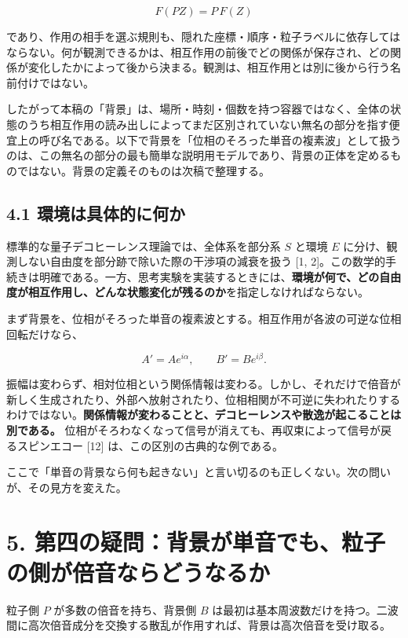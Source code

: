 \documentclass[
  a4paper,
]{ltjsarticle}
\begin{document}
\[
F(PZ)=P\,F(Z)
\]

であり、作用の相手を選ぶ規則も、隠れた座標・順序・粒子ラベルに依存してはならない。何が観測できるかは、相互作用の前後でどの関係が保存され、どの関係が変化したかによって後から決まる。観測は、相互作用とは別に後から行う名前付けではない。

したがって本稿の「背景」は、場所・時刻・個数を持つ容器ではなく、全体の状態のうち相互作用の読み出しによってまだ区別されていない無名の部分を指す便宜上の呼び名である。以下で背景を「位相のそろった単音の複素波」として扱うのは、この無名の部分の最も簡単な説明用モデルであり、背景の正体を定めるものではない。背景の定義そのものは次稿で整理する。

\subsection{4.1
環境は具体的に何か}\label{ux74b0ux5883ux306fux5177ux4f53ux7684ux306bux4f55ux304b}

標準的な量子デコヒーレンス理論では、全体系を部分系 \(S\) と環境 \(E\)
に分け、観測しない自由度を部分跡で除いた際の干渉項の減衰を扱う {[}1,
2{]}。この数学的手続きは明確である。一方、思考実験を実装するときには、\textbf{環境が何で、どの自由度が相互作用し、どんな状態変化が残るのか}を指定しなければならない。

まず背景を、位相がそろった単音の複素波とする。相互作用が各波の可逆な位相回転だけなら、

\[
A'=Ae^{i\alpha},\qquad B'=Be^{i\beta}.
\]

振幅は変わらず、相対位相という関係情報は変わる。しかし、それだけで倍音が新しく生成されたり、外部へ放射されたり、位相相関が不可逆に失われたりするわけではない。\textbf{関係情報が変わることと、デコヒーレンスや散逸が起こることは別である。}
位相がそろわなくなって信号が消えても、再収束によって信号が戻るスピンエコー
{[}12{]} は、この区別の古典的な例である。

ここで「単音の背景なら何も起きない」と言い切るのも正しくない。次の問いが、その見方を変えた。

\section{5.
第四の疑問：背景が単音でも、粒子の側が倍音ならどうなるか}\label{ux7b2cux56dbux306eux7591ux554fux80ccux666fux304cux5358ux97f3ux3067ux3082ux7c92ux5b50ux306eux5074ux304cux500dux97f3ux306aux3089ux3069ux3046ux306aux308bux304b}

粒子側 \(P\) が多数の倍音を持ち、背景側 \(B\)
は最初は基本周波数だけを持つ。二波間に高次倍音成分を交換する散乱が作用すれば、背景は高次倍音を受け取る。
\end{document}
